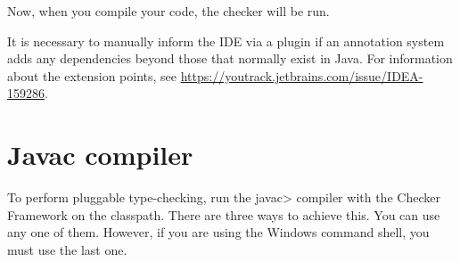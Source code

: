 Now, when you compile your code, the checker will be run.

It is necessary to manually inform the IDE via a plugin if an annotation
system adds any dependencies beyond those that normally exist in Java.
For information about the extension points, see
\url{https://youtrack.jetbrains.com/issue/IDEA-159286}.


\section{Javac compiler\label{javac-installation}}

To perform pluggable type-checking, run the \<javac> compiler with the
Checker Framework on the classpath.
There are three ways to achieve this.  You can use any
one of them.  However, if you are using the Windows command shell, you must
use the last one.


